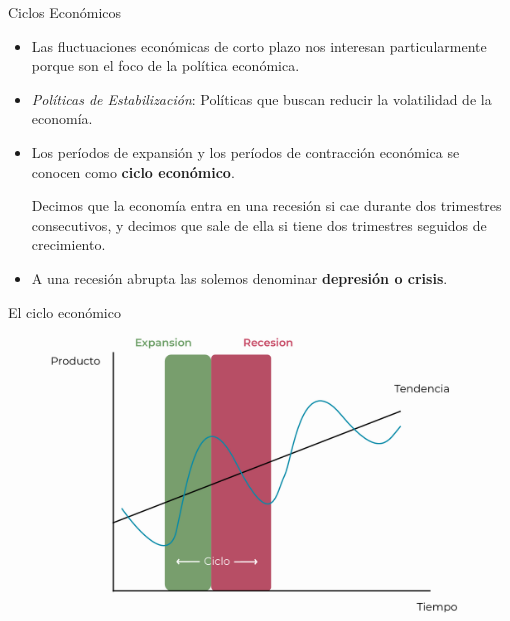 \documentclass{beamer}
\begin{document}

\begin{frame}{Ciclos Económicos}
    \begin{itemize}
        \item Las fluctuaciones económicas de corto plazo nos interesan particularmente porque son el foco de la política económica.
        \item \textit{Políticas de Estabilización}: Políticas que buscan reducir la volatilidad de la economía.
        \item Los períodos de expansión y los períodos de contracción económica se conocen como \textbf{ciclo económico}.
        \begin{boxA}
            Decimos que la economía entra en una recesión si cae durante dos trimestres consecutivos, y
            decimos que sale de ella si tiene dos trimestres seguidos de crecimiento.
        \end{boxA}
        \item A una recesión abrupta las solemos denominar \textbf{depresión o crisis}.
    \end{itemize}
\end{frame}

\begin{frame}{El ciclo económico}
    \begin{figure} [H]   
        \includegraphics[width=12cm]{../Figures/32.7.png}
    \end{figure}
\end{frame}
\end{document}
